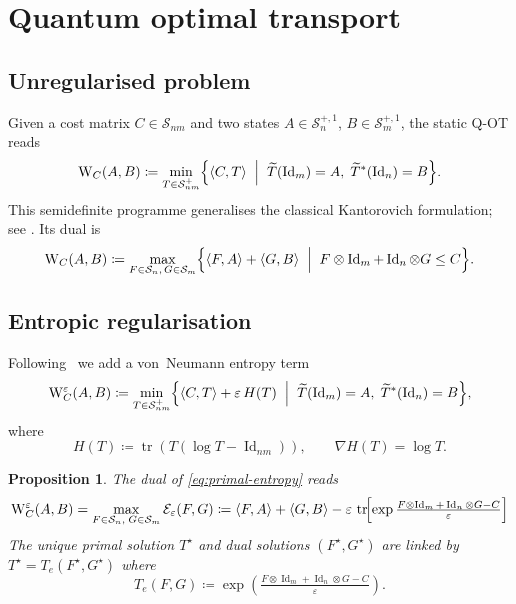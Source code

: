 \documentclass[10pt]{article}
\newcommand{\Ss}{\mathcal{S}}
\newcommand{\Ee}{\mathcal{E}}
\newcommand{\Id}{\operatorname{Id}}
\newcommand{\tr}{\operatorname{tr}}
\renewcommand{\epsilon}{\varepsilon}
\newcommand{\eqdef}{\coloneqq}
\newcommand{\To}{\widetilde{T}}
\providecommand{\dotp}[2]{\langle #1, #2\rangle}
\theoremstyle{plain}
\newtheorem{prop}{Proposition}
\theoremstyle{definition}
\theoremstyle{remark}
\begin{document}
\section{Quantum optimal transport}\label{sec:qot}

\subsection{Unregularised problem}

Given a cost matrix $C\in\Ss_{nm}$ and two states $A\in\Ss_n^{+,1}$, $B\in\Ss_m^{+,1}$, the static Q-OT reads
\begin{equation}\label{eq:primal}
\mathrm{W}_C(A,B)\coloneqq
\min_{T\in\Ss_{nm}^{+}}
\Bigl\{\dotp{C}{T}\;\Bigm|\;
\To(\Id_m)=A,\;\To^{*}(\Id_n)=B\Bigr\}.
\end{equation}
This semidefinite programme generalises the classical Kantorovich formulation; see \cite{golse2016mean,caglioti2019quantum}.  
Its dual is
\begin{equation}\label{eq:dual}
\mathrm{W}_C(A,B) \eqdef
\max_{F\in\Ss_n,\,G\in\Ss_m}
\Bigl\{
\dotp{F}{A}+\dotp{G}{B}\;\Bigm|\;
F\otimes\Id_m+\Id_n\otimes G\le C
\Bigr\}.
\end{equation}

\subsection{Entropic regularisation}\label{sec:entropy}

Following~\cite{chakrabarti2019quantum,peyre2019quantum} we add a von~Neumann entropy term
\begin{equation}\label{eq:primal-entropy}
\mathrm{W}_C^\epsilon(A,B) \eqdef 
\min_{T\in\Ss_{nm}^{+}}
\Bigl\{\dotp{C}{T}+\epsilon\,H(T)\;\Bigm|\;
\To(\Id_m)=A,\;\To^{*}(\Id_n)=B\Bigr\},
\end{equation}
where
\[
H(T)\coloneqq\tr(T(\log T-\Id_{nm})),\qquad 
\nabla H(T)=\log T.
\]

\begin{prop}
The dual of \eqref{eq:primal-entropy} reads
\begin{equation}\label{eq:dual-entropy}
\mathrm{W}_C^\epsilon(A,B) = \max_{F\in\Ss_n,\;G\in\Ss_m} \Ee_\epsilon(F,G)\coloneqq
\dotp{F}{A}+\dotp{G}{B}
-\epsilon\,\tr\!\Bigl[\exp\tfrac{F\otimes\Id_m+\Id_n\otimes G-C}{\epsilon}\Bigr]
\end{equation}
The unique primal solution $T^\star$ and dual solutions $(F^\star,G^\star)$ are linked by $T^\star = T_e(F^\star,G^\star)$ where
\begin{equation}\label{eq:primal-dual}
T_e(F,G) \eqdef \exp(\tfrac{F\otimes\Id_m+\Id_n\otimes G-C}{\epsilon}).
\end{equation}
\end{prop}
\end{document}
